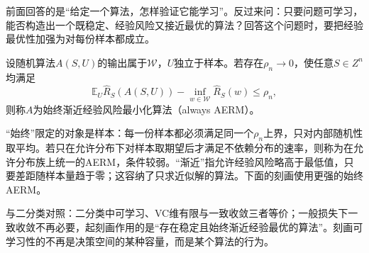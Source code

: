 前面回答的是“给定一个算法，怎样验证它能学习”。反过来问：只要问题可学习，能否构造出一个既稳定、经验风险又接近最优的算法？回答这个问题时，要把经验最优性加强为对每份样本都成立。

\begin{definition}[始终渐近经验风险最小化]
\label{def:aerm}
设随机算法$A(S,U)$的输出属于$\mathcal W$，$U$独立于样本。若存在$\rho_n\to0$，使任意$S\in Z^n$均满足
\[
 \mathbb E_U\hat R_S(A(S,U))-\inf_{w\in\mathcal W}\hat R_S(w)\leq\rho_n,
\]
则称$A$为始终渐近经验风险最小化算法（always AERM）。
\end{definition}

“始终”限定的对象是样本：每一份样本都必须满足同一个$\rho_n$上界，只对内部随机性取平均。若只在允许分布下对样本取期望后才满足不依赖分布的速率，则称为在允许分布族上统一的AERM，条件较弱。“渐近”指允许经验风险略高于最低值，只要差距随样本量趋于零；这容纳了只求近似解的算法。下面的刻画使用更强的始终AERM。

与二分类对照：二分类中可学习、VC维有限与一致收敛三者等价；一般损失下一致收敛不再必要，起刻画作用的是“存在稳定且始终渐近经验最优的算法”。刻画可学习性的不再是决策空间的某种容量，而是某个算法的行为。

